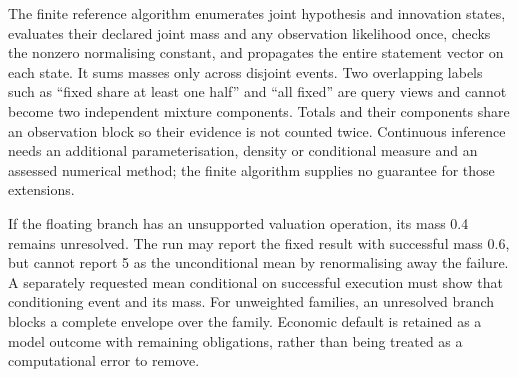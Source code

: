 The finite reference algorithm enumerates joint hypothesis and innovation
states, evaluates their declared joint mass and any observation likelihood
once, checks the nonzero normalising constant, and propagates the entire
statement vector on each state. It sums masses only across disjoint events.
Two overlapping labels such as ``fixed share at least one half'' and ``all
fixed'' are query views and cannot become two independent mixture components.
Totals and their components share an observation block so their evidence is
not counted twice. Continuous inference needs an additional parameterisation,
density or conditional measure and an assessed numerical method; the finite
algorithm supplies no guarantee for those extensions.

If the floating branch has an unsupported valuation operation, its mass 0.4
remains unresolved. The run may report the fixed result with successful mass
0.6, but cannot report 5 as the unconditional mean by renormalising away the
failure. A separately requested mean conditional on successful execution must
show that conditioning event and its mass. For unweighted families, an
unresolved branch blocks a complete envelope over the family. Economic default
is retained as a model outcome with remaining obligations, rather than being
treated as a computational error to remove.


